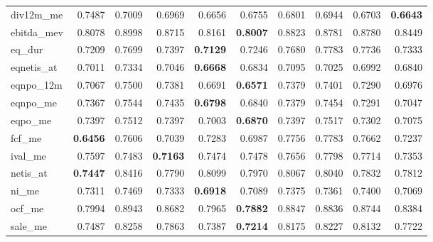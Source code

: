 \begin{longtable}{>{\raggedright\arraybackslash}p{2.6cm}rrrrrrrrr}
div12m\_me & 0.7487 & \cellcolor{blue!10}0.7009 & \cellcolor{blue!10}0.6969 & \cellcolor{blue!10}0.6656 & \cellcolor{blue!10}0.6755 & \cellcolor{blue!10}0.6801 & \cellcolor{blue!10}0.6944 & \cellcolor{blue!10}0.6703 & \textbf{\cellcolor{blue!10}0.6643} \\
ebitda\_mev & 0.8078 & 0.8998 & 0.8715 & 0.8161 & \textbf{\cellcolor{blue!10}0.8007} & 0.8823 & 0.8781 & 0.8780 & 0.8449 \\
eq\_dur & 0.7209 & 0.7699 & 0.7397 & \textbf{\cellcolor{blue!10}0.7129} & 0.7246 & 0.7680 & 0.7783 & 0.7736 & 0.7333 \\
eqnetis\_at & 0.7011 & 0.7334 & 0.7046 & \textbf{\cellcolor{blue!10}0.6668} & \cellcolor{blue!10}0.6834 & 0.7095 & 0.7025 & \cellcolor{blue!10}0.6992 & \cellcolor{blue!10}0.6840 \\
eqnpo\_12m & 0.7067 & 0.7500 & 0.7381 & \cellcolor{blue!10}0.6691 & \textbf{\cellcolor{blue!10}0.6571} & 0.7379 & 0.7401 & 0.7290 & \cellcolor{blue!10}0.6976 \\
eqnpo\_me & 0.7367 & 0.7544 & 0.7435 & \textbf{\cellcolor{blue!10}0.6798} & \cellcolor{blue!10}0.6840 & 0.7379 & 0.7454 & \cellcolor{blue!10}0.7291 & \cellcolor{blue!10}0.7047 \\
eqpo\_me & 0.7397 & 0.7512 & 0.7397 & \cellcolor{blue!10}0.7003 & \textbf{\cellcolor{blue!10}0.6870} & \cellcolor{blue!10}0.7397 & 0.7517 & \cellcolor{blue!10}0.7302 & \cellcolor{blue!10}0.7075 \\
fcf\_me & \textbf{0.6456} & 0.7606 & 0.7039 & 0.7283 & 0.6987 & 0.7756 & 0.7783 & 0.7662 & 0.7237 \\
ival\_me & 0.7597 & \cellcolor{blue!10}0.7483 & \textbf{\cellcolor{blue!10}0.7163} & \cellcolor{blue!10}0.7474 & \cellcolor{blue!10}0.7478 & 0.7656 & 0.7798 & 0.7714 & \cellcolor{blue!10}0.7353 \\
netis\_at & \textbf{0.7447} & 0.8416 & 0.7790 & 0.8099 & 0.7970 & 0.8067 & 0.8040 & 0.7832 & 0.7812 \\
ni\_me & 0.7311 & 0.7469 & 0.7333 & \textbf{\cellcolor{blue!10}0.6918} & \cellcolor{blue!10}0.7089 & 0.7375 & 0.7361 & 0.7400 & \cellcolor{blue!10}0.7069 \\
ocf\_me & 0.7994 & 0.8943 & 0.8682 & \cellcolor{blue!10}0.7965 & \textbf{\cellcolor{blue!10}0.7882} & 0.8847 & 0.8836 & 0.8744 & 0.8384 \\
sale\_me & 0.7487 & 0.8258 & 0.7863 & \cellcolor{blue!10}0.7387 & \textbf{\cellcolor{blue!10}0.7214} & 0.8175 & 0.8227 & 0.8132 & 0.7722 \\
\hline
\end{longtable}
\endgroup
